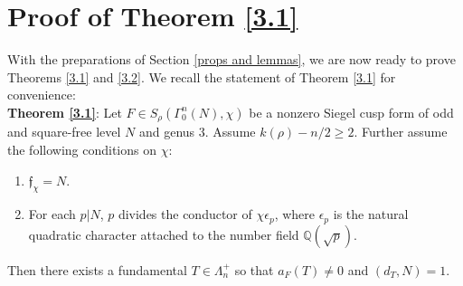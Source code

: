 \documentclass[11pt]{article}
\theoremstyle{definition}
\theoremstyle{remark}
\newcommand{\Q}{\mathbb{Q}}
\begin{document}


 
\section{Proof of Theorem \ref{3.1}} \label{proof of thm 3.1}

With the preparations of Section \ref{props and lemmas}, we are now ready to prove Theorems \ref{3.1} and \ref{3.2}. We recall the statement of Theorem \ref{3.1} for convenience: \\

{\bf Theorem \ref{3.1}}:
    Let $F \in S_\rho(\Gamma_0^n(N), \chi)$ be a nonzero Siegel cusp form of odd and square-free level $N$ and genus $3$. Assume $k(\rho) - n/2 \geq 2$. Further assume the following conditions on $\chi$:

\begin{enumerate}

\item $\mathfrak{f}_\chi = N$. 

\item For each $p \vert N$, $p$ divides the conductor of $\chi \epsilon_p$, where $\epsilon_p$ is the natural quadratic character attached to the number field $\Q(\sqrt{p})$. 

\end{enumerate}

Then there exists a fundamental $T \in \Lambda_n^+$ so that $a_F(T) \neq 0$ and $(d_T,N) = 1$. \\
\end{document}
